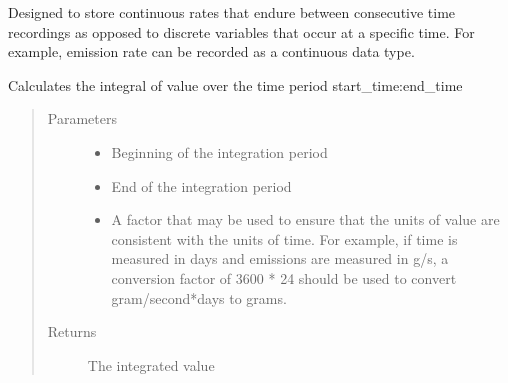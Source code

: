 \documentclass[letterpaper,10pt,english]{sphinxmanual}
\begin{document}
\begin{fulllineitems}
\label{\detokenize{index:feast.EmissionSimModules.result_classes.ResultContinuous}}
Designed to store continuous rates that endure between consecutive time recordings as opposed to discrete
variables that occur at a specific time. For example, emission rate can be recorded as a continuous data type.

\begin{fulllineitems}
\label{\detokenize{index:feast.EmissionSimModules.result_classes.ResultContinuous.get_time_integrated}}
Calculates the integral of value over the time period start\_time:end\_time
\begin{quote}\begin{description}
\item[{Parameters}] \leavevmode\begin{itemize}
\item {} 
 \textendash{} Beginning of the integration period

\item {} 
 \textendash{} End of the integration period

\item {} 
 \textendash{} A factor that may be used to ensure that the units of value are consistent with the units of
time. For example, if time is measured in days and emissions are measured in g/s, a conversion factor of
3600 * 24 should be used to convert gram/second*days to grams.

\end{itemize}

\item[{Returns}] \leavevmode
The integrated value

\end{description}\end{quote}

\end{fulllineitems}


\end{fulllineitems}
\end{document}
